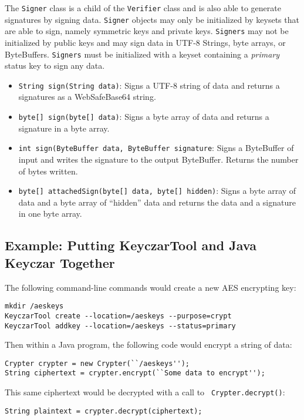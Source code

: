\documentclass{llncs}
\begin{document}
The {\tt Signer} class is a child of the {\tt Verifier} class and is
also able to generate signatures by signing data. {\tt Signer} objects
may only be initialized by keysets that are able to sign, namely
symmetric keys and private keys. {\tt Signers} may not be initialized
by public keys and may sign data in UTF-8 Strings, byte arrays, or
ByteBuffers. {\tt Signers} must be initialized with a keyset
containing a {\it primary} status key to sign any data.
\begin{itemize}
  \item {\tt String sign(String data)}: Signs a UTF-8 string of data
    and returns a signatures as a WebSafeBase64 string.
  \item {\tt byte[] sign(byte[] data)}: Signs a byte array of data and
    returns a signature in a byte array.
  \item {\tt int sign(ByteBuffer data, ByteBuffer signature}: Signs a
    ByteBuffer of input and writes the signature to the output
    ByteBuffer.  Returns the number of bytes written.
  \item {\tt byte[] attachedSign(byte[] data, byte[] hidden)}: Signs a
    byte array of data and a byte array of ``hidden'' data and returns
    the data and a signature in one byte array.
\end{itemize}

\subsection{Example: Putting KeyczarTool and Java Keyczar Together}

The following command-line commands would create a new AES encrypting
key:


\begin{verbatim}
mkdir /aeskeys
KeyczarTool create --location=/aeskeys --purpose=crypt
KeyczarTool addkey --location=/aeskeys --status=primary
\end{verbatim}

Then within a Java program, the following code would encrypt a string
of data:


\begin{verbatim}
Crypter crypter = new Crypter(``/aeskeys'');
String ciphertext = crypter.encrypt(``Some data to encrypt'');
\end{verbatim}

This same ciphertext would be decrypted with a call to {\tt
Crypter.decrypt()}:

\begin{verbatim}
String plaintext = crypter.decrypt(ciphertext);
\end{verbatim}
\end{document}
